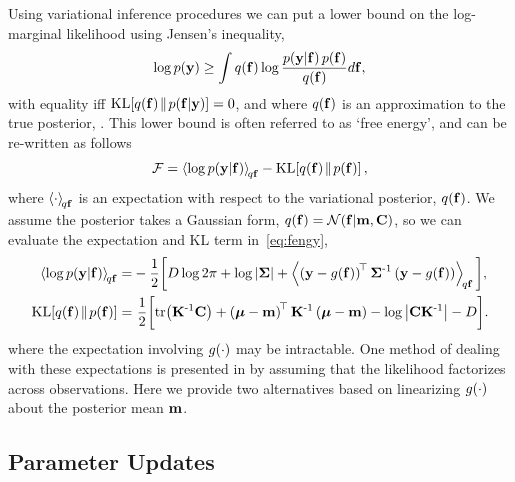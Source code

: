 \documentclass{article} %
\begin{document}
Using variational inference procedures we can put a lower bound on the
log-marginal likelihood using Jensen's inequality, 
\begin{equation}
    \log p\!\left({\mathbf{y}}\right) \geq \int q\!\left({\mathbf{f}}\right) \log 
        \frac{p\!\left({\mathbf{y}}\middle\vert{\ensuremath{\mathbf{f}}}\right)p\!\left({\mathbf{f}}\right)}{q\!\left({\mathbf{f}}\right)} d\mathbf{f},
\end{equation}
with equality iff $\text{KL}\!\left[{{q\!\left({\mathbf{f}}\right)}\!\parallel\!{p\!\left({\mathbf{f}}\middle\vert{\ensuremath{\mathbf{y}}}\right)}}\right] = 0$, and where
$q\!\left({\mathbf{f}}\right)$ is an approximation to the true posterior,
\probC{\lstate}{\obs}. This lower bound is often referred to as `free energy',
and can be re-written as follows
\begin{equation}
    \mathcal{F} = \left\langle{\log \ensuremath{p\!\left({\mathbf{y}}\middle\vert{\ensuremath{\mathbf{f}}}\right)}}\right\rangle_{\!{q\mathbf{f}}}
        - \text{KL}\!\left[{{q\!\left({\mathbf{f}}\right)}\!\parallel\!{p\!\left({\mathbf{f}}\right)}}\right],
    \label{eq:fengy}
\end{equation}
where $\left\langle{\cdot}\right\rangle_{\!{q\mathbf{f}}}$ is an expectation with respect to the
variational posterior, $q\!\left({\mathbf{f}}\right)$. We assume the posterior takes a
Gaussian form, $q\!\left({\mathbf{f}}\right) = \mathcal{N}\!\left({\mathbf{f}}\middle\vert{\ensuremath{\mathbf{m}}, \ensuremath{\mathbf{C}}}\right)$, so
we can evaluate the expectation and KL term in~\eqref{eq:fengy},
\begin{align}
    \expec{q\lstate}{\log \probC{\obs}{\lstate}}
        =& -\frac{1}{2} \bigg[ 
            D\log{2\pi} + \log\deter{\lcov} 
            + \expec{q\lstate}{\brac{\obs - \nonlin{\lstate}}\transpose\lcov\inv
            \brac{\obs - \nonlin{\lstate}}}\bigg],
            \label{eq:qlike} \\
     \KL{\qrob{\lstate}}{\prob{\lstate}}
        =& ~\frac{1}{2} \bigg[\trace{\prcov\inv\pocov}
        + \brac{\prmean - \pomean}\transpose\prcov\inv
        \brac{\prmean - \pomean} 
        - \log \deter{\pocov\prcov\inv}
        - D\bigg] \label{eq:qkl}.
\end{align}
where the expectation involving $g\!\left({{\cdot}}\right)$ may be intractable. One method
of dealing with these expectations is presented in \cite{Opper2009} by assuming
that the likelihood factorizes across observations. Here we provide two
alternatives based on linearizing $g\!\left({{\cdot}}\right)$ about  the posterior mean
$\mathbf{m}$.


\subsection{Parameter Updates}
\end{document}
